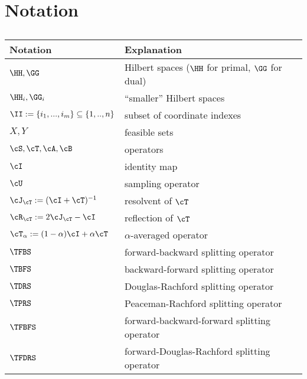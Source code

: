 \section*{Notation}

\begin{table}[htbp]
 \caption{\label{tab:notation}}
 \begin{tabular}{ll}
  \toprule
  Notation & Explanation \\
  \midrule
  $\HH,\GG$ & Hilbert spaces ($\HH$ for primal, $\GG$ for dual) \\
  $\HH_i,\GG_i$ &``smaller'' Hilbert spaces \\
  $\II := \{i_1, ..., i_m \} \subseteq \{1, .., n\}$  & subset of coordinate indexes\\
  $X, Y$ & feasible sets \\
  \midrule
  $\cS, \cT, \cA, \cB$ & operators \\ 
  $\cI$ & identity map \\
  $\cU$ & sampling operator \\
  $\cJ_{\cT} := (\cI + \cT) ^ {-1}$ & resolvent of $\cT$ \\ 
  $\cR_{\cT} := 2 \cJ_{\cT} - \cI$ & reflection of $\cT$ \\ 
  $\cT_{\alpha} := (1 - \alpha) \cI + \alpha \cT$ & $\alpha$-averaged operator\\
  $\TFBS$ & forward-backward splitting operator \\
  $\TBFS$ & backward-forward splitting operator \\
  $\TDRS$ & Douglas-Rachford splitting operator \\
  $\TPRS$ & Peaceman-Rachford splitting operator \\
  $\TFBFS$ & forward-backward-forward splitting operator \\
  $\TFDRS$ & forward-Douglas-Rachford splitting operator \\
  

\end{tabular}
\end{table}
